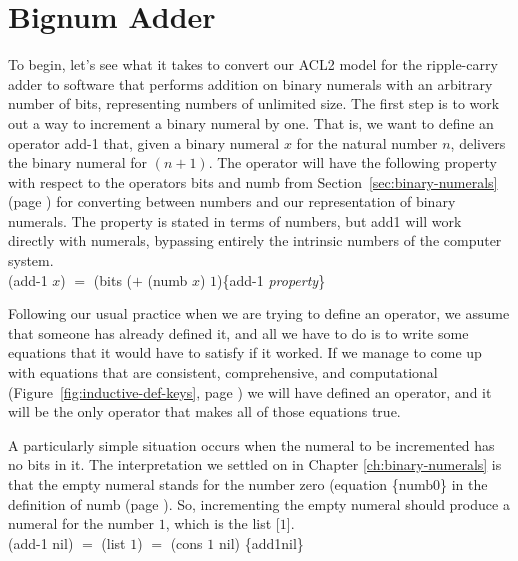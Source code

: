 \section{Bignum Adder}
\label{sec:bignum-adder}

To begin, let's see what it takes to convert our ACL2 model for
the ripple-carry adder to software that performs addition on
binary numerals with an arbitrary number of bits,
representing numbers of unlimited size.
The first step is to work out a way to increment a
binary numeral by one.
That is,
we want to define an operator \textsf{add-1} that, given a
binary numeral $x$ for the natural number $n$, delivers the
binary numeral for $(n+1)$.
The operator will have the following
property with respect to the operators \textsf{bits} and \textsf{numb} from
Section~\ref{sec:binary-numerals} (page \pageref{bits-defun})
for converting between numbers and our representation
of binary numerals. The property is stated in terms of numbers,
but \textsf{add1} will work directly with numerals,
bypassing entirely the intrinsic numbers of the computer system.
\\
\vspace{2mm}
\hspace*{2cm}
\textsf{(add-1 $x$)} $=$ \textsf{(bits ($+$ (numb $x$) $1$)}\hfill\{add-1 \emph{property}\}

Following our usual practice when we are trying to define an operator,
we assume that someone has already defined it,
and all we have to do is to write some equations that it
would have to satisfy if it worked. If we manage
to come up with equations that are consistent, comprehensive, and computational
(Figure~\ref{fig:inductive-def-keys}, page \pageref{fig:inductive-def-keys})
we will have defined an operator,
and it will be the only operator that makes all of those equations true.

A particularly simple situation occurs when the numeral to be incremented
has no bits in it. The interpretation we settled on
in Chapter \ref{ch:binary-numerals} is that
the empty numeral stands for the number zero
(equation \{numb0\} in the definition of \textsf{numb} (page \pageref{nmb-defun}).
So, incrementing the empty numeral should produce a numeral for the number $1$,
which is the list \textsf{[$1$]}.
\\
\vspace{2mm}
\hspace*{2cm}
\textsf{(add-1 nil)} $=$ \textsf{(list $1$)} $=$ \textsf{(cons $1$ nil)}  \hfill \{add1nil\}

